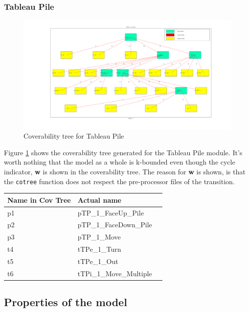 \documentclass[runningheads,a4paper]{llncs}
\begin{document}
\subsubsection{Tableau Pile}
\begin{center}
	\begin{figure}
		\includegraphics[trim=450 80 150 100,scale=0.3]{images/tableauPile_CovTree}
		\caption{Coverability tree for Tableau Pile}
		\label{fig:cov_tree_tableau_pile}
	\end{figure}
\end{center}
Figure \ref{fig:cov_tree_tableau_pile} shows the coverability tree generated for the Tableau Pile module. It's worth nothing that the model as a whole is k-bounded even though the cycle indicator, \textbf{w} is shown in the coverability tree. The reason for \textbf{w} is shown, is that the \verb!cotree! function does not respect the pre-processor files of the transition.
\begin{center}
	\begin{tabular}{ | l | l | l | }
		\hline
		Name in Cov Tree & Actual name \\ \hline
		p1 & pTP\_1\_FaceUp\_Pile  \\ \hline
		p2 & pTP\_1\_FaceDown\_Pile \\ \hline
		p3 & pTP\_1\_Move  \\ \hline
		t4 & tTPe\_1\_Turn  \\ \hline
		t5 & tTPe\_1\_Out  \\ \hline
		t6 & tTPi\_1\_Move\_Multiple  \\ \hline
	\end{tabular}
\end{center}
\clearpage
\subsection{Properties of the model}
\label{sec:4_properties}
\end{document}
